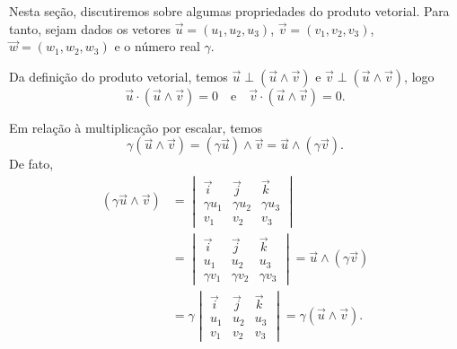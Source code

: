 Nesta seção, discutiremos sobre algumas propriedades do produto vetorial. Para tanto, sejam dados os vetores $\vec{u} = (u_1,u_2,u_3)$, $\vec{v}=(v_1,v_2,v_3)$, $\vec{w}=(w_1,w_2,w_3)$ e o número real $\gamma$.

Da definição do produto vetorial, temos $\vec{u}\perp(\vec{u}\land\vec{v})$ e $\vec{v}\perp(\vec{u}\land\vec{v})$, logo
\begin{equation}
  \vec{u}\cdot(\vec{u}\land\vec{v}) = 0\quad\text{e}\quad\vec{v}\cdot(\vec{u}\land\vec{v}) = 0.
\end{equation}

Em relação à multiplicação por escalar, temos
\begin{equation}
  \gamma(\vec{u}\land\vec{v}) = (\gamma\vec{u})\land\vec{v} = \vec{u}\land(\gamma\vec{v}).
\end{equation}
De fato,
\begin{align}
  (\gamma\vec{u}\land\vec{v}) &=
                                \begin{vmatrix}
                                  \vec{i} & \vec{j} & \vec{k} \\
                                  \gamma u_1 & \gamma u_2 & \gamma u_3\\
                                  v_1 & v_2 & v_3
                                \end{vmatrix} \\
                              &=
                                \begin{vmatrix}
                                  \vec{i} & \vec{j} & \vec{k} \\
                                  u_1 & u_2 & u_3\\
                                  \gamma v_1 & \gamma v_2 & \gamma v_3
                                \end{vmatrix} = \vec{u}\land(\gamma\vec{v})\\
                              &= \gamma\begin{vmatrix}
                                  \vec{i} & \vec{j} & \vec{k} \\
                                  u_1 & u_2 & u_3\\
                                  v_1 & v_2 & v_3
                                \end{vmatrix} = \gamma(\vec{u}\land\vec{v}).\\
\end{align}

